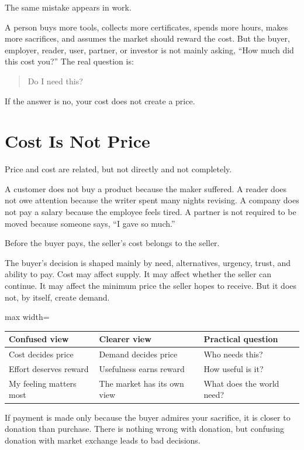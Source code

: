 The same mistake appears in work.

A person buys more tools, collects more certificates, spends more hours, makes more sacrifices, and assumes the market should reward the cost. But the buyer, employer, reader, user, partner, or investor is not mainly asking, ``How much did this cost you?'' The real question is:

\begin{quote}
Do I need this?
\end{quote}

If the answer is no, your cost does not create a price.

\section*{Cost Is Not Price}

Price and cost are related, but not directly and not completely.

A customer does not buy a product because the maker suffered. A reader does not owe attention because the writer spent many nights revising. A company does not pay a salary because the employee feels tired. A partner is not required to be moved because someone says, ``I gave so much.''

Before the buyer pays, the seller's cost belongs to the seller.

The buyer's decision is shaped mainly by need, alternatives, urgency, trust, and ability to pay. Cost may affect supply. It may affect whether the seller can continue. It may affect the minimum price the seller hopes to receive. But it does not, by itself, create demand.

\begin{center}
\begin{adjustbox}{max width=\linewidth}
\begin{tabular}{lll}
\hline
Confused view & Clearer view & Practical question \\
\hline
Cost decides price & Demand decides price & Who needs this? \\
Effort deserves reward & Usefulness earns reward & How useful is it? \\
My feeling matters most & The market has its own view & What does the world need? \\
\hline
\end{tabular}
\end{adjustbox}
\end{center}

If payment is made only because the buyer admires your sacrifice, it is closer to donation than purchase. There is nothing wrong with donation, but confusing donation with market exchange leads to bad decisions.

